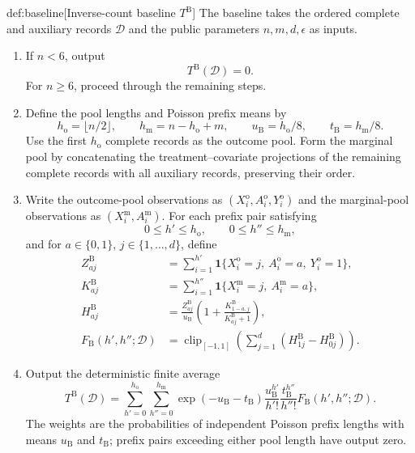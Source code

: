 \documentclass[11pt]{article}
\begin{document}
\begin{algorithmv}{def:baseline}[Inverse-count baseline $T^{\mathrm B}$]
The baseline takes the ordered complete and auxiliary records \(\mathcal D\) and the public parameters \(n,m,d,\epsilon\) as inputs.
\begin{enumerate}
\item If \(n<6\), output
\[
T^{\mathrm B}(\mathcal D)=0.
\]
For \(n\ge6\), proceed through the remaining steps.

\item Define the pool lengths and Poisson prefix means by
\[
h_{\mathrm o}=\lfloor n/2\rfloor,\qquad
h_{\mathrm m}=n-h_{\mathrm o}+m,\qquad
u_{\mathrm B}=h_{\mathrm o}/8,\qquad
t_{\mathrm B}=h_{\mathrm m}/8.
\]
Use the first \(h_{\mathrm o}\) complete records as the outcome pool. Form the marginal pool by concatenating the treatment--covariate projections of the remaining complete records with all auxiliary records, preserving their order.

\item Write the outcome-pool observations as
\((X_i^{\mathrm o},A_i^{\mathrm o},Y_i^{\mathrm o})\) and the marginal-pool observations as
\((X_i^{\mathrm m},A_i^{\mathrm m})\). For each prefix pair satisfying
\[
0\le h'\le h_{\mathrm o},\qquad
0\le h''\le h_{\mathrm m},
\]
and for \(a\in\{0,1\}\), \(j\in\{1,\ldots,d\}\), define
\[
\begin{aligned}
Z_{aj}^{\mathrm B}
&=\sum_{i=1}^{h'}
\mathbf1\{X_i^{\mathrm o}=j,\ A_i^{\mathrm o}=a,\ Y_i^{\mathrm o}=1\},\\
K_{aj}^{\mathrm B}
&=\sum_{i=1}^{h''}
\mathbf1\{X_i^{\mathrm m}=j,\ A_i^{\mathrm m}=a\},\\
H_{aj}^{\mathrm B}
&=\frac{Z_{aj}^{\mathrm B}}{u_{\mathrm B}}
\left(1+\frac{K_{1-a,j}^{\mathrm B}}{K_{aj}^{\mathrm B}+1}\right),\\
F_{\mathrm B}(h',h'';\mathcal D)
&=\operatorname{clip}_{[-1,1]}
\left(\sum_{j=1}^d(H_{1j}^{\mathrm B}-H_{0j}^{\mathrm B})\right).
\end{aligned}
\]

\item Output the deterministic finite average
\[
T^{\mathrm B}(\mathcal D)
=
\sum_{h'=0}^{h_{\mathrm o}}\sum_{h''=0}^{h_{\mathrm m}}
\exp(-u_{\mathrm B}-t_{\mathrm B})
\frac{u_{\mathrm B}^{h'}}{h'!}
\frac{t_{\mathrm B}^{h''}}{h''!}
F_{\mathrm B}(h',h'';\mathcal D).
\]
The weights are the probabilities of independent Poisson prefix lengths with means \(u_{\mathrm B}\) and \(t_{\mathrm B}\); prefix pairs exceeding either pool length have output zero.
\end{enumerate}
\end{algorithmv}
\end{document}
